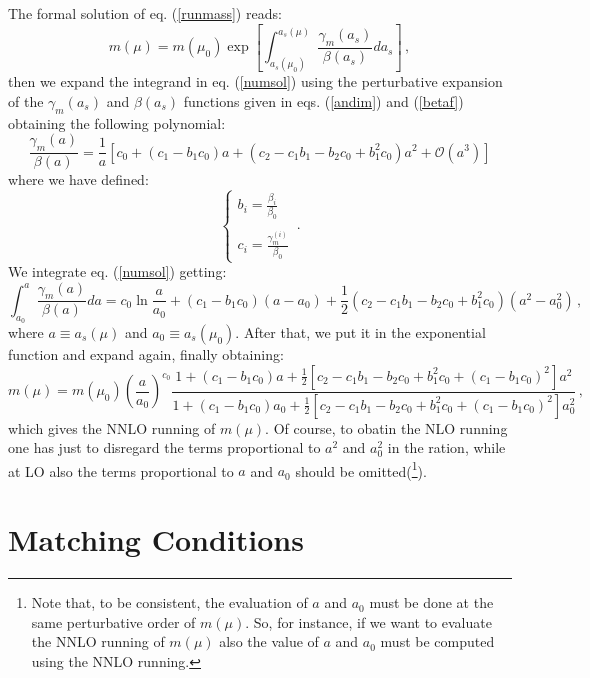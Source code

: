 \documentclass[10pt,a4paper]{article}
\begin{document}
The formal solution of eq. (\ref{runmass}) reads:
\begin{equation}
m(\mu) =
m(\mu_0)\exp\left[\int_{a_s(\mu_0)}^{a_s(\mu)}\frac{\gamma_m(a_s)}{\beta(a_s)}da_s\right]\,,
\label{numsol}
\end{equation}
then we expand the integrand in eq. (\ref{numsol}) using the perturbative expansion of the $\gamma_m(a_s)$ and $\beta(a_s)$ functions given in eqs. (\ref{andim}) and (\ref{betaf}) obtaining the following polynomial:
\begin{equation}
\frac{\gamma_m(a)}{\beta(a)} = \frac1{a}\left[c_0 + (c_1-b_1c_0)a+(c_2-c_1b_1-b_2c_0+b_1^2c_0)a^2+\mathcal{O}(a^3)\right]
\end{equation}
where we have defined:
\begin{equation}
\left\{\begin{array}{l}
\displaystyle b_i = \frac{\beta_i}{\beta_0}\\
\\
\displaystyle c_i = \frac{\gamma_m^{(i)}}{\beta_0}
\end{array}\right.\,.
\label{jhgkgfkgf}
\end{equation}
We integrate eq. (\ref{numsol}) getting:
\begin{equation}
\int_{a_0}^a\frac{\gamma_m(a)}{\beta(a)}da = c_0\ln\frac{a}{a_0} +
(c_1-b_1c_0)(a-a_0)+\frac12(c_2-c_1b_1-b_2c_0+b_1^2c_0)(a^2-a_0^2)\,,
\label{integral}
\end{equation}
where  $a\equiv a_s(\mu)$ and $a_0\equiv a_s(\mu_0)$. After that, we put it in the exponential function and expand again, finally obtaining:
\begin{equation}
m(\mu)=m(\mu_0)\left(\frac{a}{a_0}\right)^{c_0}\frac{1+(c_1-b_1c_0)a+\frac12[c_2-c_1b_1-b_2c_0+b_1^2c_0+(c_1-b_1c_0)^2]a^2}{1+(c_1-b_1c_0)a_0+\frac12[c_2-c_1b_1-b_2c_0+b_1^2c_0+(c_1-b_1c_0)^2]a_0^2}\,,
\label{ansol}
\end{equation}
which gives the NNLO running of $m(\mu)$. Of course, to obatin the NLO
running one has just to disregard the terms proportional to $a^2$ and
$a_0^2$ in the ration, while at LO also the terms proportional to $a$
and $a_0$ should be omitted(\footnote{Note that, to be consistent, the evaluation of $a$ and $a_0$ must be done at the same perturbative order of $m(\mu)$. So, for instance, if we want to evaluate the NNLO running of $m(\mu)$ also the value of $a$ and $a_0$ must be computed using the NNLO running.}).

\section{Matching Conditions}
\end{document}
